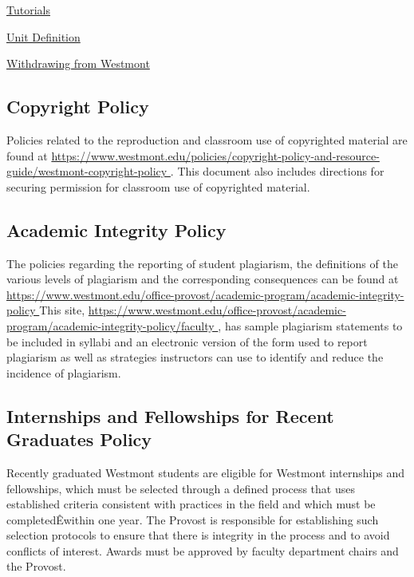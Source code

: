 		\href{https://www.westmont.edu/office-registrar/academic-policies-and-procedures/tutorials} {Tutorials}

		\href{https://www.westmont.edu/office-registrar/academic-policies-and-procedures/unit-definition} {Unit Definition}

		\href{https://www.westmont.edu/office-registrar/academic-policies-and-procedures/withdrawing-westmont-college} {Withdrawing from Westmont}



	\subsection{Copyright Policy}
		Policies related to the reproduction and classroom use of copyrighted
		material are found at
		\href{
			https://www.westmont.edu/policies/copyright-policy-and-resource-guide/westmont-copyright-policy
		}{\url{
				https://www.westmont.edu/policies/copyright-policy-and-resource-guide/westmont-copyright-policy
			}}
		.
		This document also includes directions for securing permission for classroom use of copyrighted material.
	\subsection{Academic Integrity Policy}
		The policies regarding the reporting of student plagiarism, the definitions
		of the various levels of plagiarism and the corresponding consequences can be
		found at
		\href{
			https://www.westmont.edu/office-provost/academic-program/academic-integrity-policy
		}
		{\url{
				https://www.westmont.edu/office-provost/academic-program/academic-integrity-policy
			}}
		This site,
		\href{
			https://www.westmont.edu/office-provost/academic-program/academic-integrity-policy/faculty
		}
		{\url{
				https://www.westmont.edu/office-provost/academic-program/academic-integrity-policy/faculty
			}},
		has sample plagiarism statements to be included
		in syllabi and an electronic version of the form used to report plagiarism as well as strategies instructors can use to identify and reduce the incidence of plagiarism.
	\subsection{Internships and Fellowships for Recent Graduates Policy}
		Recently graduated Westmont students are eligible for Westmont internships and fellowships, which must be selected through a defined process that uses established criteria consistent with practices in the field and which must be completedÊwithin one year. The Provost is responsible for establishing such selection protocols to ensure that there is integrity in the process and to avoid conflicts of interest. Awards must be approved by faculty department chairs and the Provost.
